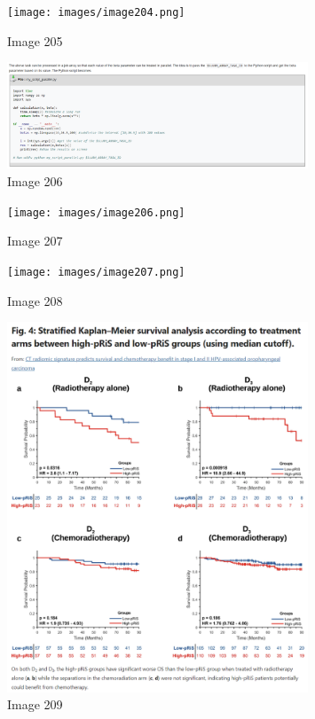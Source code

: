 \documentclass{article}%
\begin{document}
%


\begin{figure}[h!]%
\centering%
\texttt{[image: images/image204.png]}%
\caption{Image 205}%
\end{figure}

%


\begin{figure}[h!]%
\centering%
\includegraphics[width=0.8\textwidth]{images/image205.png}%
\caption{Image 206}%
\end{figure}

%


\begin{figure}[h!]%
\centering%
\texttt{[image: images/image206.png]}%
\caption{Image 207}%
\end{figure}

%


\begin{figure}[h!]%
\centering%
\texttt{[image: images/image207.png]}%
\caption{Image 208}%
\end{figure}

%


\begin{figure}[h!]%
\centering%
\includegraphics[width=0.8\textwidth]{images/image208.png}%
\caption{Image 209}%
\end{figure}
\end{document}
